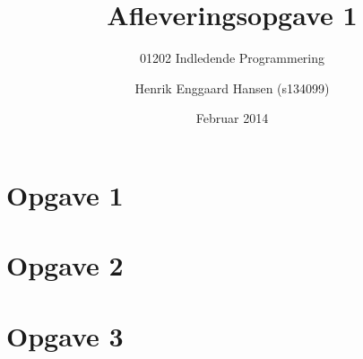 \documentclass{scrartcl}
\begin{document}
\title{Afleveringsopgave 1}
\subtitle{01202 Indledende Programmering}
\author{Henrik Enggaard Hansen (s134099)}
\date{Februar 2014}
\maketitle

\section*{Opgave 1}

\section*{Opgave 2}

\section*{Opgave 3}
\end{document}
